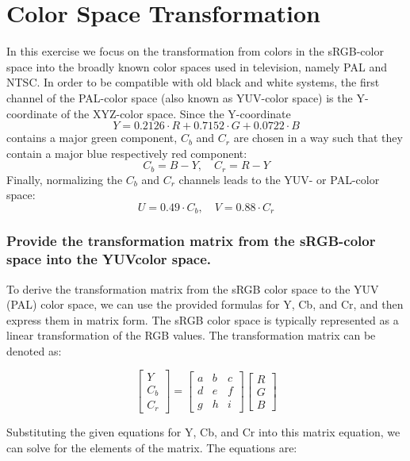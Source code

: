 \documentclass{article}
\begin{document}
\section{Color Space Transformation}
In this exercise we focus on the transformation from colors in the sRGB-color space
into the broadly known color spaces used in television, namely PAL and NTSC.
In order to be compatible with old black and white systems, the first channel
of the PAL-color space (also known as YUV-color space) is the Y-coordinate
of the XYZ-color space. Since the Y-coordinate
\[ Y = 0.2126 \cdot R + 0.7152 \cdot G + 0.0722 \cdot B \]
contains a major green component, \( C_b \) and \( C_r \) are chosen in a way such that
they contain a major blue respectively red component:
\[ C_b = B - Y, \quad C_r = R - Y \]
Finally, normalizing the \(C_b\) and \(C_r\) channels leads to the YUV- or PAL-color space:
\[ U = 0.49 \cdot C_b, \quad V = 0.88 \cdot C_r \]

\subsubsection*{Provide the transformation matrix from the sRGB-color space into the YUVcolor space.}
To derive the transformation matrix from the sRGB color space to the YUV (PAL) color space, we can use the provided formulas for Y, Cb, and Cr, and then express them in matrix form. The sRGB color space is typically represented as a linear transformation of the RGB values. The transformation matrix can be denoted as:

\[ \begin{bmatrix} Y \\ C_b \\ C_r \end{bmatrix} = \begin{bmatrix} a & b & c \\ d & e & f \\ g & h & i \end{bmatrix} \begin{bmatrix} R \\ G \\ B \end{bmatrix} \]

Substituting the given equations for Y, Cb, and Cr into this matrix equation, we can solve for the elements of the matrix. The equations are:
\end{document}
